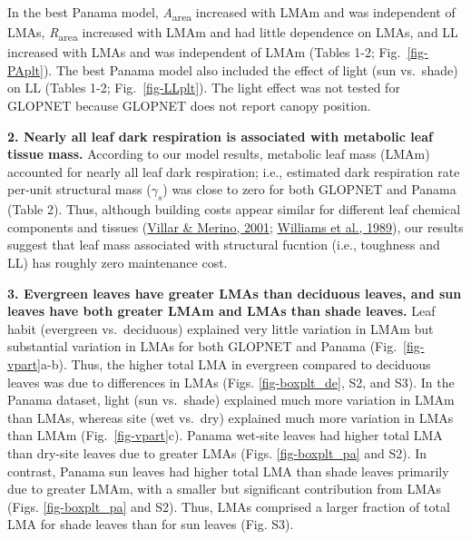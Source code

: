 \documentclass[
  12pt,
  a4paper,
,tablecaptionabove
]{scrartcl}
\begin{document}
In the best Panama model, \emph{A}\textsubscript{area} increased with
LMAm and was independent of LMAs, \emph{R}\textsubscript{area} increased
with LMAm and had little dependence on LMAs, and LL increased with LMAs
and was independent of LMAm (Tables 1-2; Fig.~\ref{fig-PAplt}). The best
Panama model also included the effect of light (sun vs.~shade) on LL
(Tables 1-2; Fig.~\ref{fig-LLplt}). The light effect was not tested for
GLOPNET because GLOPNET does not report canopy position.

\textbf{2. Nearly all leaf dark respiration is associated with metabolic
leaf tissue mass.} According to our model results, metabolic leaf mass
(LMAm) accounted for nearly all leaf dark respiration; i.e., estimated
dark respiration rate per-unit structural mass (\(\gamma_s\)) was close
to zero for both GLOPNET and Panama (Table 2). Thus, although building
costs appear similar for different leaf chemical components and tissues
(\protect\hyperlink{ref-Villar2001}{Villar \& Merino, 2001};
\protect\hyperlink{ref-Williams1989}{Williams et al., 1989}), our
results suggest that leaf mass associated with structural fucntion
(i.e., toughness and LL) has roughly zero maintenance cost.

\textbf{3. Evergreen leaves have greater LMAs than deciduous leaves, and
sun leaves have both greater LMAm and LMAs than shade leaves.} Leaf
habit (evergreen vs.~deciduous) explained very little variation in LMAm
but substantial variation in LMAs for both GLOPNET and Panama
(Fig.~\ref{fig-vpart}a-b). Thus, the higher total LMA in evergreen
compared to deciduous leaves was due to differences in LMAs (Figs.
\ref{fig-boxplt_de}, S2, and S3). In the Panama dataset, light (sun
vs.~shade) explained much more variation in LMAm than LMAs, whereas site
(wet vs.~dry) explained much more variation in LMAs than LMAm
(Fig.~\ref{fig-vpart}c). Panama wet-site leaves had higher total LMA
than dry-site leaves due to greater LMAs (Figs. \ref{fig-boxplt_pa} and
S2). In contrast, Panama sun leaves had higher total LMA than shade
leaves primarily due to greater LMAm, with a smaller but significant
contribution from LMAs (Figs. \ref{fig-boxplt_pa} and S2). Thus, LMAs
comprised a larger fraction of total LMA for shade leaves than for sun
leaves (Fig. S3).
\end{document}
